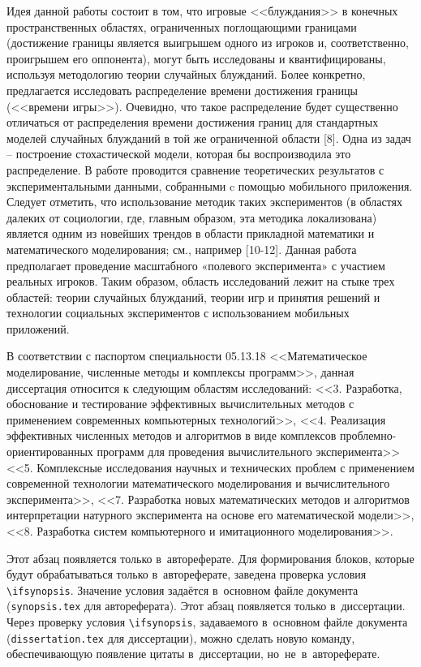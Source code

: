 Идея данной работы состоит в том, что игровые <<блуждания>> в конечных пространственных областях, ограниченных поглощающими границами 
(достижение границы является выигрышем одного из игроков и, соответственно, проигрышем его оппонента), 
могут быть исследованы и квантифицированы, используя методологию теории случайных блужданий. Более конкретно, 
предлагается исследовать распределение времени достижения границы (<<времени игры>>). Очевидно, что такое распределение 
будет существенно отличаться от распределения времени достижения границ для стандартных моделей случайных блужданий 
в той же ограниченной области [8]. Одна из задач -- построение стохастической модели, которая бы воспроизводила это распределение. 
В работе проводится сравнение теоретических результатов с экспериментальными данными, собранными c помощью мобильного приложения. 
Следует отметить, что использование методик таких экспериментов (в областях далеких от социологии, где, главным образом, эта методика локализована) 
является одним из новейших трендов в области прикладной математики и математического моделирования; см., например [10-12].
Данная работа предполагает проведение масштабного «полевого эксперимента» с участием реальных игроков. 
Таким образом, область исследований лежит на стыке трех областей: теории случайных блужданий, теории игр и принятия решений 
и технологии социальных экспериментов с использованием мобильных приложений. 

В соответствии с паспортом специальности 05.13.18 <<Математическое моделирование,
численные методы и комплексы программ>>, данная диссертация
относится к следующим областям исследований: <<3. Разработка, обоснование
и тестирование эффективных вычислительных методов с применением современных
компьютерных технологий>>, <<4. Реализация эффективных численных методов и алгоритмов в виде
комплексов проблемно-ориентированных программ для проведения
вычислительного эксперимента>> <<5. Комплексные исследования научных и
технических проблем с применением современной технологии математического
моделирования и вычислительного эксперимента>>, <<7. Разработка новых математических
методов и алгоритмов интерпретации натурного эксперимента на
основе его математической модели>>, <<8. Разработка систем компьютерного и имитационного моделирования>>.

\ifsynopsis
Этот абзац появляется только в~автореферате.
Для формирования блоков, которые будут обрабатываться только в~автореферате,
заведена проверка условия \verb!\!\verb!ifsynopsis!.
Значение условия задаётся в~основном файле документа (\verb!synopsis.tex! для
автореферата).
\else
Этот абзац появляется только в~диссертации.
Через проверку условия \verb!\!\verb!ifsynopsis!, задаваемого в~основном файле
документа (\verb!dissertation.tex! для диссертации), можно сделать новую
команду, обеспечивающую появление цитаты в~диссертации, но~не~в~автореферате.
\fi

